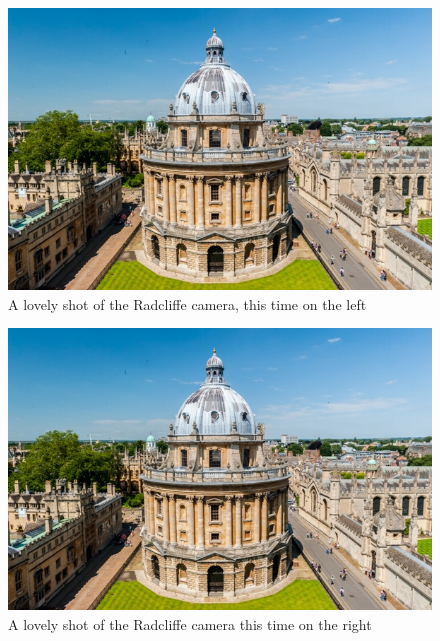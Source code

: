 \documentclass[../main.tex]{subfiles}
\begin{document}
\begin{figure}[H]
    \includegraphics[width=0.3\linewidth,left]{Chapter5/images/Radcliffe-Camera-8163.jpg}
    \caption{A lovely shot of the Radcliffe camera, this time on the left}
    \label{fig:enter-label}
\end{figure}
\begin{figure}[H]
    \includegraphics[width=0.3\linewidth,right]{Chapter5/images/Radcliffe-Camera-8163.jpg}
    \caption{A lovely shot of the Radcliffe camera this time on the right}
    \label{fig:enter-label}
\end{figure}
\end{document}
